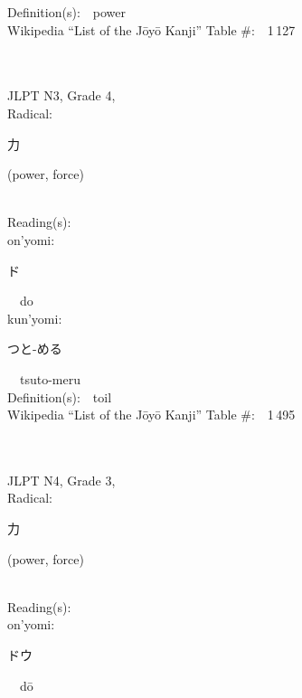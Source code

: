 \begin{multicols}{2}
Definition(s):\ \ power \\
Wikipedia ``List of the J\=oy\=o Kanji'' Table \#:\ \ 1\,127 \\
\ \ \\
{\fontsize{34pt}{40pt}  }\ \ \\  %
{JLPT N3, Grade 4, \\Radical:\ \ {\begin{CJK}{UTF8}{min} 力 \end{CJK}} (power, force) } \\
Reading(s):\ \ \\
{\hspace*{1em}}on'yomi:\ \ \\
{\hspace*{2em}}{\begin{CJK}{UTF8}{min} ド \end{CJK}}\ \ do\ \ \\
{\hspace*{1em}}kun'yomi:\ \ \\
{\hspace*{2em}}{\begin{CJK}{UTF8}{min} つと-める \end{CJK}}\ \ tsuto-meru\ \ \\
Definition(s):\ \ toil \\
Wikipedia ``List of the J\=oy\=o Kanji'' Table \#:\ \ 1\,495 \\
\ \ \\
{\fontsize{34pt}{40pt}  }\ \ \\  %
{JLPT N4, Grade 3, \\Radical:\ \ {\begin{CJK}{UTF8}{min} 力 \end{CJK}} (power, force) } \\
Reading(s):\ \ \\
{\hspace*{1em}}on'yomi:\ \ \\
{\hspace*{2em}}{\begin{CJK}{UTF8}{min} ドウ \end{CJK}}\ \ d\=o\ \ \\

\end{multicols}

